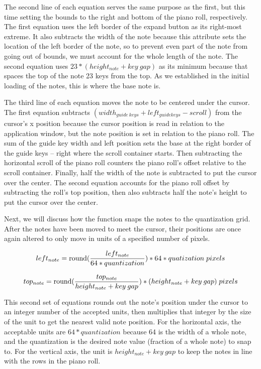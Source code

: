 The second line of each equation serves the same purpose as the first, but this time setting the
bounds to the right and bottom of the piano roll, respectively. The first equation uses the left
border of the expand button as its right-most extreme. It also subtracts the width of the note
because this attribute sets the location of the left border of the note, so to prevent even part
of the note from going out of bounds, we must account for the whole length of the note. The second
equation uses $ 23*(height_{note} + key\: gap) $ as its minimum because that spaces the top of the
note 23 keys from the top. As we established in the initial loading of the notes, this is where the
base note is.

The third line of each equation moves the note to be centered under the cursor. The first equation
subtracts $ (width_{guide\:keys} +left_{guide keys} - scroll) $ from the cursor’s x position because
the cursor position is read in relation to the application window, but the note position is set in
relation to the piano roll. The sum of the guide key width and left position sets the base at the
right border of the guide keys -- right where the scroll container starts. Then subtracting the
horizontal scroll of the piano roll counters the piano roll’s offset relative to the scroll
container. Finally, half the width of the note is subtracted to put the cursor over the center. The
second equation accounts for the piano roll offset by subtracting the roll’s top position, then
also subtracts half the note’s height to put the cursor over the center.

Next, we will discuss how the function snaps the notes to the quantization grid. After the notes
have been moved to meet the cursor, their positions are once again altered to only move in units of
a specified number of pixels.

\begin{equation} \label{vert_snap}
  left_{note} = \operatorname{round}(\frac{left_{note}}{64 * quantization}) * 64 * quatization \;pixels
\end{equation}

\begin{equation} \label{horz_snap}
  top_{note} = \operatorname{round}(\frac{top_{note}}{height_{note} + key\:gap}) * (height_{note} + key\:gap) \;pixels
\end{equation}

This second set of equations rounds out the note’s position under the cursor to an integer number
of the accepted units, then multiplies that integer by the size of the unit to get the nearest
valid note position. For the horizontal axis, the acceptable units are $ 64 * quantization $
because 64 is the width of a whole note, and the quantization is the desired note value (fraction
of a whole note) to snap to. For the vertical axis, the unit is $ height_{note} + key\:gap $ to
keep the notes in line with the rows in the piano roll.

